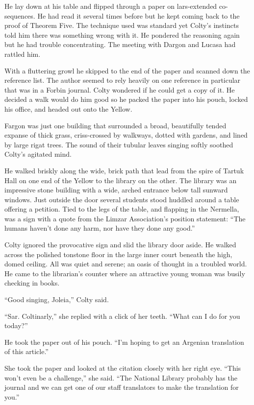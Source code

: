 He lay down at his table and flipped through a paper on lars-extended co-sequences. He had read
it several times before but he kept coming back to the proof of Theorem Five. The technique used
was standard yet Colty's instincts told him there was something wrong with it. He pondered the
reasoning again but he had trouble concentrating. The meeting with Dargon and Lucasa had
rattled him.

With a fluttering growl he skipped to the end of the paper and scanned down the reference list.
The author seemed to rely heavily on one reference in particular that was in a Forbin journal.
Colty wondered if he could get a copy of it. He decided a walk would do him good so he packed
the paper into his pouch, locked his office, and headed out onto the Yellow.

Fargon was just one building that surrounded a broad, beautifully tended expanse of thick grass,
criss-crossed by walkways, dotted with gardens, and lined by large rigat trees. The sound of
their tubular leaves singing softly soothed Colty's agitated mind.

He walked briskly along the wide, brick path that lead from the spire of Tartuk Hall on one end
of the Yellow to the library on the other. The library was an impressive stone building with a
wide, arched entrance below tall sunward windows. Just outside the door several students stood
huddled around a table offering a petition. Tied to the legs of the table, and flapping in the
Nermella, was a sign with a quote from the Limzar Association's position statement: ``The humans
haven't done any harm, nor have they done any good.''

Colty ignored the provocative sign and slid the library door aside. He walked across the
polished tonstone floor in the large inner court beneath the high, domed ceiling. All was quiet
and serene; an oasis of thought in a troubled world. He came to the librarian's counter where an
attractive young woman was busily checking in books.

``Good singing, Joleia,'' Colty said.

``Sar. Coltinarly,'' she replied with a click of her teeth. ``What can I do for you today?''

He took the paper out of his pouch. ``I'm hoping to get an Argenian translation of this
article.''

She took the paper and looked at the citation closely with her right eye. ``This won't even be a
challenge,'' she said. ``The National Library probably has the journal and we can get one of our
staff translators to make the translation for you.''

